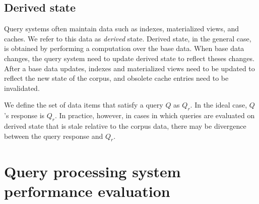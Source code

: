 


\subsection{Derived state}
Query systems often maintain data such as indexes, materialized views, and caches.
We refer to this data as \textit{derived} state.
Derived state, in the general case, is obtained by performing a computation over the base data.
When base data changes, the query system need to update derived state to reflect theses changes.
After a base data updates, indexes and materialized views need to be updated to reflect the new state of the corpus,
and obsolete cache entries need to be invalidated.

We define the set of data items that satisfy a query $Q$ as $Q_r$.
In the ideal case, $Q$'s response is $Q_r$.
In practice, however, in cases in which queries are evaluated on derived state that is stale relative to the corpus data,
there may be divergence between the query response and $Q_r$.

\section{Query processing system performance evaluation}
\label{sec:requirements}

